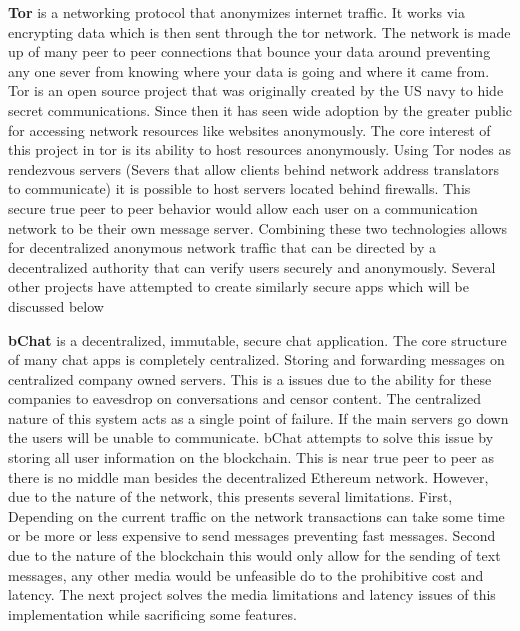 \documentclass{article}
\begin{document}
\textbf{Tor} is a networking protocol that anonymizes internet traffic. 
It works via encrypting data which is then sent through the tor network. 
The network is made up of many peer to peer connections that bounce your data around preventing any one sever from knowing where your data is going and where it came from. 
Tor is an open source project that was originally created by the US navy to hide secret communications.
Since then it has seen wide adoption by the greater public for accessing network resources like websites anonymously. 
The core interest of this project in tor is its ability to host resources anonymously. 
Using Tor nodes as rendezvous servers (Severs that allow clients behind network address translators to communicate) it is possible to host servers located behind firewalls. 
This secure true peer to peer behavior would allow each user on a communication network to be their own message server.
Combining these two technologies allows for decentralized anonymous network traffic that can be directed by a decentralized authority that can verify users securely and anonymously. 
Several other projects have attempted to create similarly secure apps which will be discussed below

\textbf{bChat} is a decentralized, immutable, secure chat application.
The core structure of many chat apps is completely centralized. 
Storing and forwarding messages on centralized company owned servers. 
This is a issues due to the ability for these companies to eavesdrop on conversations and censor content. The centralized nature of this system acts as a single point of failure. 
If the main servers go down the users will be unable to communicate. 
bChat attempts to solve this issue by storing all user information on the blockchain. 
This is near true peer to peer as there is no middle man besides the decentralized Ethereum network. 
However, due to the nature of the network, this presents several limitations. 
First, Depending on the current traffic on the network transactions can take some time or be more or less expensive to send messages preventing fast messages. 
Second due to the nature of the blockchain this would only allow for the sending of text messages, any other media would be unfeasible do to the prohibitive cost and latency. 
The next project solves the media limitations and latency issues of this implementation while sacrificing some features.
\end{document}
